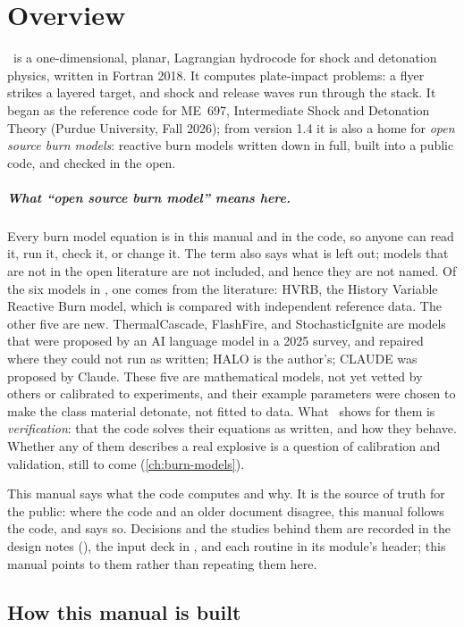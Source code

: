 \chapter{Overview}
\label{ch:overview}

\bw\ is a one-dimensional, planar, Lagrangian hydrocode for shock and
detonation physics, written in Fortran 2018. It computes plate-impact
problems: a flyer strikes a layered target, and shock and release waves run
through the stack. It began as the reference code for ME~697, Intermediate
Shock and Detonation Theory (Purdue University, Fall 2026); from version 1.4
it is also a home for \emph{open source burn models}: reactive burn models
written down in full, built into a public code, and checked in the open.

\paragraph{What ``open source burn model'' means here.} Every burn model
equation is in this manual and in the code, so anyone can read it, run it,
check it, or change it. The term also says what is left out; models that
are not in the open literature are not included, and hence they are not
named.
Of the six models in \bw, one comes from the literature: HVRB, the
History Variable Reactive Burn model, which is compared with independent
reference data. The other five are new. ThermalCascade, FlashFire, and
StochasticIgnite are models that were proposed by an AI language model in
a 2025 survey, and repaired where they could not run as written; HALO is the author's;
CLAUDE was proposed by Claude. These five are mathematical models, not
yet vetted by others or calibrated to experiments, and their example
parameters were chosen to make the class material detonate, not fitted to
data. What \bw\ shows for them is \emph{verification}: that the code
solves their equations as written, and how they behave. Whether any of
them describes a real explosive is a question of calibration and
validation, still to come (\cref{ch:burn-models}).

This manual says what the code computes and why. It is the source of truth
for the public: where the code and an older document disagree, this manual
follows the code, and says so. Decisions and the studies behind them are
recorded in the design notes (), the input deck in
, and each routine in its module's header; this manual
points to them rather than repeating them here.

\section{How this manual is built}

